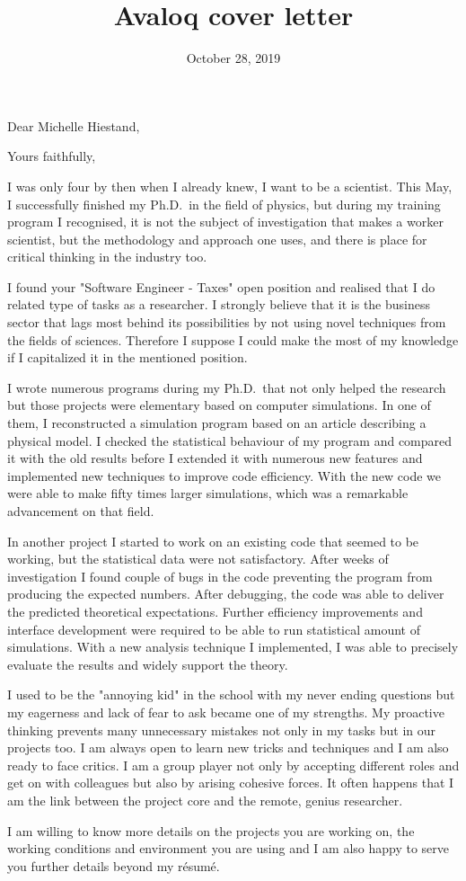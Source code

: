 \documentclass[11pt,a4paper,sans]{moderncv}        %
\title{Avaloq cover letter}                               %
\begin{document}
\date{October 28, 2019}
\opening{Dear Michelle Hiestand,}
\closing{Yours faithfully,}
\makelettertitle

I was only four by then when I already knew, I want to be a scientist. This May, I successfully finished my Ph.D.\ in the field of physics, but during my training program I recognised, it is not the subject of investigation that makes a worker scientist, but the methodology and approach one uses, and there is place for critical thinking in the industry too.

I found your "Software Engineer - Taxes" open position and realised that I do related type of tasks as a researcher. I strongly believe that it is the business sector that lags most behind its possibilities by not using novel techniques from the fields of sciences. Therefore I suppose I could make the most of my knowledge if I capitalized it in the mentioned position.

I wrote numerous programs during my Ph.D.\ that not only helped the research but those projects were elementary based on computer simulations. In one of them, I reconstructed a simulation program based on an article describing a physical model. I checked the statistical behaviour of my program and compared it with the old results before I extended it with numerous new features and implemented new techniques to improve code efficiency. With the new code we were able to make fifty times larger simulations, which was a remarkable advancement on that field.

In another project I started to work on an existing code that seemed to be working, but the statistical data were not satisfactory. After weeks of investigation I found couple of bugs in the code preventing the program from producing the expected numbers. After debugging, the code was able to deliver the predicted theoretical expectations. Further efficiency improvements and interface development were required to be able to run statistical amount of simulations. With a new analysis technique I implemented, I was able to precisely evaluate the results and widely support the theory.

I used to be the "annoying kid" in the school with my never ending questions but my eagerness and lack of fear to ask became one of my strengths. My proactive thinking prevents many unnecessary mistakes not only in my tasks but in our projects too. I am always open to learn new tricks and techniques and I am also ready to face critics. I am a group player not only by accepting different roles and get on with colleagues but also by arising cohesive forces.  It often happens that I am the link between the project core and the remote, genius researcher.

I am willing to know more details on the projects you are working on, the working conditions and environment you are using and I am also happy to serve you further details beyond my résumé.

\makeletterclosing
\end{document}
